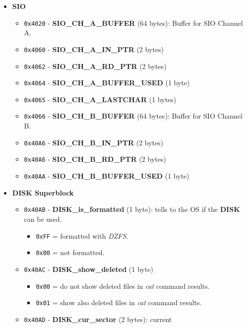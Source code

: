 \documentclass[a4paper,11pt]{article}
\begin{document}
    \begin{itemize}
        \item \textbf{SIO}
        \begin{itemize}
            \item \texttt{0x4020} - \textbf{SIO\_CH\_A\_BUFFER} (64 bytes):
            Buffer for SIO Channel A.
            \item \texttt{0x4060} - \textbf{SIO\_CH\_A\_IN\_PTR} (2 bytes)
            \item \texttt{0x4062} - \textbf{SIO\_CH\_A\_RD\_PTR} (2 bytes)
            \item \texttt{0x4064} - \textbf{SIO\_CH\_A\_BUFFER\_USED} (1 byte)
            \item \texttt{0x4065} - \textbf{SIO\_CH\_A\_LASTCHAR} (1 bytes)
            \item \texttt{0x4066} - \textbf{SIO\_CH\_B\_BUFFER} (64 bytes):
            Buffer for SIO Channel B.
            \item \texttt{0x40A6} - \textbf{SIO\_CH\_B\_IN\_PTR} (2 bytes)
            \item \texttt{0x40A6} - \textbf{SIO\_CH\_B\_RD\_PTR} (2 bytes)
            \item \texttt{0x40AA} - \textbf{SIO\_CH\_B\_BUFFER\_USED} (1 byte)
        \end{itemize}
        \item \textbf{DISK Superblock}
        \begin{itemize}
            \item \texttt{0x40AB} - \textbf{DISK\_is\_formatted} (1 byte): tells
            to the OS if the \textbf{DISK} can be used.
            \begin{itemize}
                \item \texttt{0xFF} = formatted with \textit{DZFS}.
                \item \texttt{0x00} = not formatted.
            \end{itemize}
            \item \texttt{0x40AC} - \textbf{DISK\_show\_deleted} (1 byte)
            \begin{itemize}
                \item \texttt{0x00} = do not show deleted files in \textit{cat}
                command results.
                \item \texttt{0x01} = show also deleted files in \textit{cat}
                command results.
            \end{itemize}
            \item \texttt{0x40AD} - \textbf{DISK\_cur\_sector} (2 bytes): current

\end{itemize}
\end{itemize}
\end{document}
